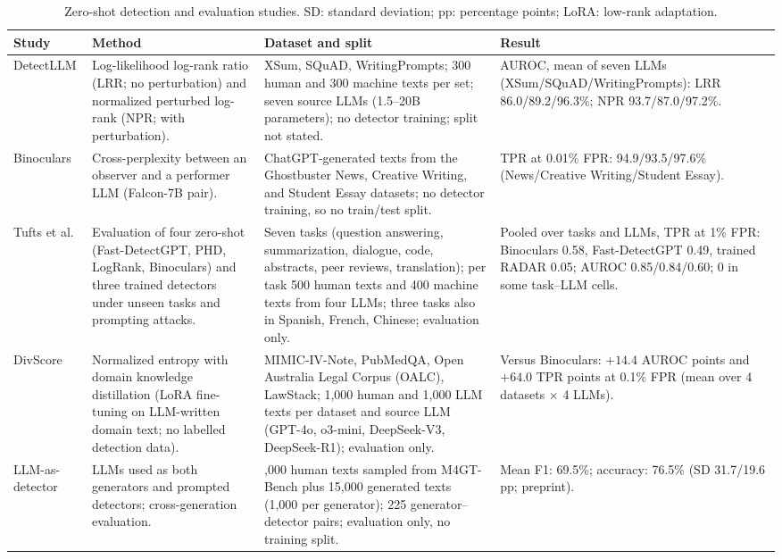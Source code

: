 \documentclass[11pt]{article}
\begin{document}
\begin{table}[!t]
\centering\scriptsize
\begin{tabularx}{\textwidth}{>{\raggedright\arraybackslash}p{} >{\raggedright\arraybackslash}p{} >{\raggedright\arraybackslash}p{} >{\raggedright\arraybackslash}X}
\toprule
\textbf{Study} & \textbf{Method} & \textbf{Dataset and split} & \textbf{Result}\\
\midrule
DetectLLM \cite{su-etal-2023-detectllm} & Log-likelihood log-rank ratio (LRR; no perturbation) and normalized perturbed log-rank (NPR; with perturbation). & XSum, SQuAD, WritingPrompts; 300 human and 300 machine texts per set; seven source LLMs (1.5--20B parameters); no detector training; split not stated. & AUROC, mean of seven LLMs (XSum/SQuAD/WritingPrompts): LRR 86.0/89.2/96.3\%; NPR 93.7/87.0/97.2\%.\\
Binoculars \cite{pmlr-v235-hans24a} & Cross-perplexity between an observer and a performer LLM (Falcon-7B pair). & ChatGPT-generated texts from the Ghostbuster News, Creative Writing, and Student Essay datasets; no detector training, so no train/test split. & TPR at 0.01\% FPR: 94.9/93.5/97.6\% (News/Creative Writing/Student Essay).\\
Tufts et al. \cite{tufts-etal-2025-practical} & Evaluation of four zero-shot (Fast-DetectGPT, PHD, LogRank, Binoculars) and three trained detectors under unseen tasks and prompting attacks. & Seven tasks (question answering, summarization, dialogue, code, abstracts, peer reviews, translation); per task 500 human texts and 400 machine texts from four LLMs; three tasks also in Spanish, French, Chinese; evaluation only. & Pooled over tasks and LLMs, TPR at 1\% FPR: Binoculars 0.58, Fast-DetectGPT 0.49, trained RADAR 0.05; AUROC 0.85/0.84/0.60; 0 in some task--LLM cells.\\
DivScore \cite{chen-etal-2025-divscore} & Normalized entropy with domain knowledge distillation (LoRA fine-tuning on LLM-written domain text; no labelled detection data). & MIMIC-IV-Note, PubMedQA, Open Australia Legal Corpus (OALC), LawStack; 1,000 human and 1,000 LLM texts per dataset and source LLM (GPT-4o, o3-mini, DeepSeek-V3, DeepSeek-R1); evaluation only. & Versus Binoculars: $+14.4$ AUROC points and $+64.0$ TPR points at 0.1\% FPR (mean over 4 datasets $\times$ 4 LLMs).\\
LLM-as-detector \cite{yuan2026crossgeneration} & 15 LLMs used as both generators and prompted detectors; cross-generation evaluation. & 1,000 human texts sampled from M4GT-Bench \cite{wang2024m4gt} plus 15,000 generated texts (1,000 per generator); 225 generator--detector pairs; evaluation only, no training split. & Mean F1: 69.5\%; accuracy: 76.5\% (SD 31.7/19.6 pp; preprint).\\
\bottomrule
\end{tabularx}
\caption{Zero-shot detection and evaluation studies. SD: standard deviation; pp: percentage points; LoRA: low-rank adaptation.}
\label{tab:zeroshot}
\end{table}
\end{document}
